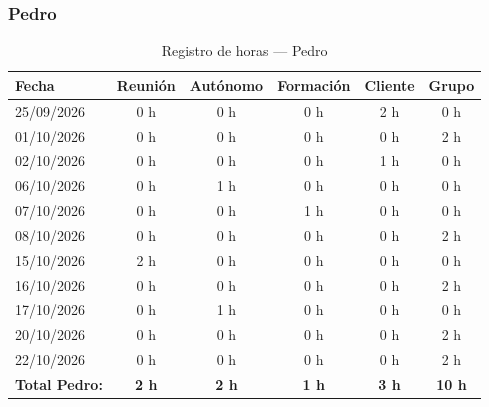 \subsubsection{Pedro}
\begin{table}[H]
\centering
\small
\begin{tabularx}{\textwidth}{l c c c c c}
\toprule
\textbf{Fecha} & \textbf{Reunión} & \textbf{Autónomo} & \textbf{Formación} & \textbf{Cliente} & \textbf{Grupo} \\
\midrule
25/09/2026 & 0 h & 0 h & 0 h & 2 h & 0 h \\
01/10/2026 & 0 h & 0 h & 0 h & 0 h & 2 h \\
02/10/2026 & 0 h & 0 h & 0 h & 1 h & 0 h \\
06/10/2026 & 0 h & 1 h & 0 h & 0 h & 0 h \\
07/10/2026 & 0 h & 0 h & 1 h & 0 h & 0 h \\
08/10/2026 & 0 h & 0 h & 0 h & 0 h & 2 h \\
15/10/2026 & 2 h & 0 h & 0 h & 0 h & 0 h \\
16/10/2026 & 0 h & 0 h & 0 h & 0 h & 2 h \\
17/10/2026 & 0 h & 1 h & 0 h & 0 h & 0 h \\
20/10/2026 & 0 h & 0 h & 0 h & 0 h & 2 h \\
22/10/2026 & 0 h & 0 h & 0 h & 0 h & 2 h \\
\midrule
\textbf{Total Pedro:} & \textbf{2 h} & \textbf{2 h} & \textbf{1 h} & \textbf{3 h} & \textbf{10 h} \\
\bottomrule
\end{tabularx}
\caption{Registro de horas — Pedro}
\end{table}

